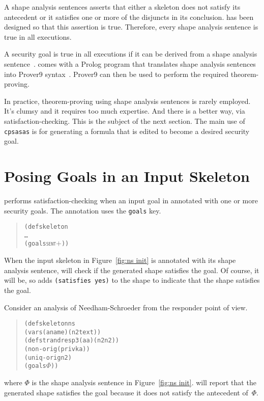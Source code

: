 \documentclass[12pt]{article}
\begin{document}
A shape analysis sentences asserts that either a skeleton does not
satisfy its antecedent or it satisfies one or more of the disjuncts in
its conclusion.  {\cpsa} has been designed so that this assertion is
true.  Therefore, every shape analysis sentence is true in all
executions.

A security goal is true in all executions if it can be derived from a
shape analysis sentence~\cite{Ramsdell12}.  {\cpsa} comes with a
Prolog program that translates shape analysis sentences into Prover9
syntax~\cite{prover9}.  Prover9 can then be used to perform the
required theorem-proving.

In practice, theorem-proving using shape analysis sentences is rarely
employed.  It's clumsy and it requires too much expertise.  And there
is a better way, via satisfaction-checking.  This is the subject of
the next section.  The main use of \texttt{cpsasas} is for generating
a formula that is edited to become a desired security goal.

\section{Posing Goals in an Input Skeleton}\label{sec:posing}

{\cpsa} performs satisfaction-checking when an input goal in annotated
with one or more security goals.  The annotation uses the
\texttt{goals} key.

\begin{quote}
  \begin{alltt}
(defskeleton
   \ldots
   (goals \textsc{sent\ensuremath{+}}))
  \end{alltt}
\end{quote}

When the input skeleton in Figure~\ref{fig:ns init} is annotated with
its shape analysis sentence, {\cpsa} will check if the generated shape
satisfies the goal.  Of course, it will be, so {\cpsa} adds
\texttt{(satisfies yes)} to the shape to indicate that the shape
satisfies the goal.

Consider an analysis of Needham-Schroeder from the responder point of view.
\begin{quote}
  \begin{alltt}
(defskeleton ns
  (vars (a name) (n2 text))
  (defstrand resp 3 (a a) (n2 n2))
  (non-orig (privk a))
  (uniq-orig n2)
  (goals \(\Phi\)))
  \end{alltt}
\end{quote}
where \(\Phi\) is the shape analysis sentence in Figure~\ref{fig:ns
  init}.  {\cpsa} will report that the generated shape satisfies the
goal because it does not satisfy the antecedent of~\(\Phi\).
\end{document}
